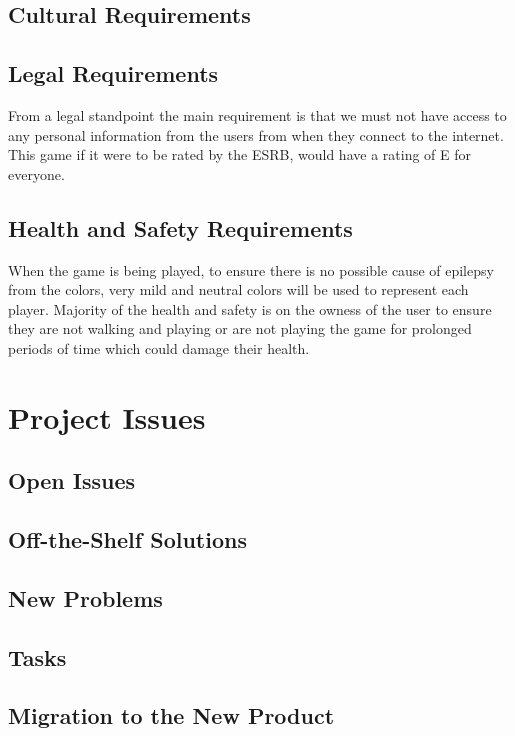 \documentclass[12pt, titlepage]{article}
\begin{document}
\subsection{Cultural Requirements}

\subsection{Legal Requirements}
From a legal standpoint the main requirement is that we must not have access to any personal information from the users from when they connect to the internet. This game if it were to be rated by the ESRB, would have a rating of E for everyone. 
\subsection{Health and Safety Requirements}
When the game is being played, to ensure there is no possible cause of epilepsy from the colors, very mild and neutral colors will be used to represent each player. Majority of the health and safety is on the owness of the user to ensure they are not walking and playing or are not playing the game for prolonged periods of time which could damage their health.

\section{Project Issues}

\subsection{Open Issues}

\subsection{Off-the-Shelf Solutions}

\subsection{New Problems}

\subsection{Tasks}

\subsection{Migration to the New Product}
\end{document}
